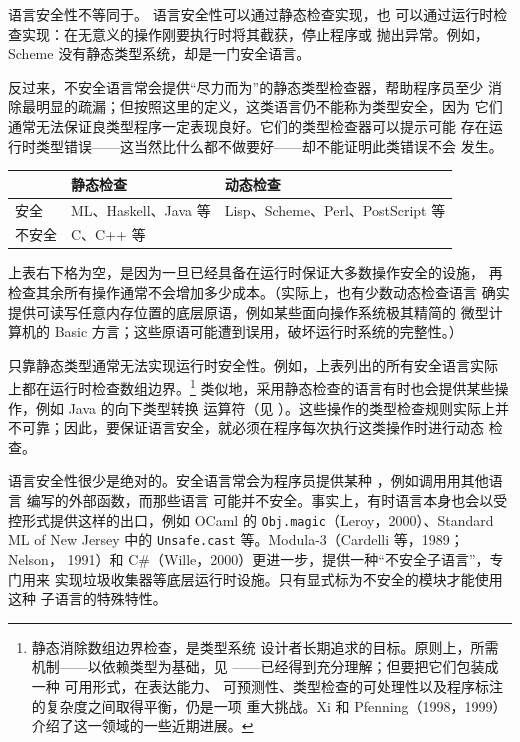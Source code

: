 语言安全性不等同于。
语言安全性可以通过静态检查实现，也
可以通过运行时检查实现：在无意义的操作刚要执行时将其截获，停止程序或
抛出异常。例如，Scheme 没有静态类型系统，却是一门安全语言。

反过来，不安全语言常会提供“尽力而为”的静态类型检查器，帮助程序员至少
消除最明显的疏漏；但按照这里的定义，这类语言仍不能称为类型安全，因为
它们通常无法保证良类型程序一定表现良好。它们的类型检查器可以提示可能
存在运行时类型错误——这当然比什么都不做要好——却不能证明此类错误不会
发生。

\begin{center}
  \begin{tabular}{@{}lll@{}}
    \toprule
      & 静态检查 & 动态检查 \\
    \midrule
    安全   & ML、Haskell、Java 等 & Lisp、Scheme、Perl、PostScript 等 \\
    不安全 & C、C++ 等              & \\
    \bottomrule
  \end{tabular}
\end{center}

上表右下格为空，是因为一旦已经具备在运行时保证大多数操作安全的设施，
再检查其余所有操作通常不会增加多少成本。（实际上，也有少数动态检查语言
确实提供可读写任意内存位置的底层原语，例如某些面向操作系统极其精简的
微型计算机的 Basic 方言；这些原语可能遭到误用，破坏运行时系统的完整性。）

只靠静态类型通常无法实现运行时安全性。例如，上表列出的所有安全语言实际
上都在运行时检查数组边界。\footnote{静态消除数组边界检查，是类型系统
设计者长期追求的目标。原则上，所需机制——以依赖类型为基础，见
——已经得到充分理解；但要把它们包装成一种
可用形式，在表达能力、
可预测性、类型检查的可处理性以及程序标注的复杂度之间取得平衡，仍是一项
重大挑战。Xi 和 Pfenning（1998，1999）介绍了这一领域的一些近期进展。}
类似地，采用静态检查的语言有时也会提供某些操作，例如 Java 的向下类型转换
运算符（见 ）。这些操作的类型检查规则实际上并
不可靠；因此，要保证语言安全，就必须在程序每次执行这类操作时进行动态
检查。

语言安全性很少是绝对的。安全语言常会为程序员提供某种
，例如调用用其他语言
编写的外部函数，而那些语言
可能并不安全。事实上，有时语言本身也会以受控形式提供这样的出口，例如
OCaml 的 \texttt{Obj.magic}（Leroy，2000）、Standard ML of New Jersey
中的 \texttt{Unsafe.cast} 等。Modula-3（Cardelli 等，1989；Nelson，
1991）和 C\#（Wille，2000）更进一步，提供一种“不安全子语言”，专门用来
实现垃圾收集器等底层运行时设施。只有显式标为不安全的模块才能使用这种
子语言的特殊特性。

